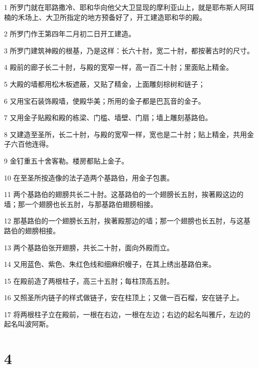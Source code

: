 \par 1 所罗门就在耶路撒冷、耶和华向他父大卫显现的摩利亚山上，就是耶布斯人阿珥楠的禾场上、大卫所指定的地方预备好了，开工建造耶和华的殿。
\par 2 所罗门作王第四年二月初二日开工建造。
\par 3 所罗门建筑神殿的根基，乃是这样：长六十肘，宽二十肘，都按著古时的尺寸。
\par 4 殿前的廊子长二十肘，与殿的宽窄一样，高一百二十肘；里面贴上精金。
\par 5 大殿的墙都用松木板遮蔽，又贴了精金，上面雕刻棕树和链子；
\par 6 又用宝石装饰殿墙，使殿华美；所用的金子都是巴瓦音的金子。
\par 7 又用金子贴殿和殿的栋梁、门槛、墙壁、门扇；墙上雕刻基路伯。
\par 8 又建造至圣所，长二十肘，与殿的宽窄一样，宽也是二十肘；贴上精金，共用金子六百他连得。
\par 9 金钉重五十舍客勒。楼房都贴上金子。
\par 10 在至圣所按造像的法子造两个基路伯，用金子包裹。
\par 11 两个基路伯的翅膀共长二十肘。这基路伯的一个翅膀长五肘，挨著殿这边的墙；那一个翅膀也长五肘，与那基路伯翅膀相接。
\par 12 那基路伯的一个翅膀长五肘，挨著殿那边的墙；那一个翅膀也长五肘，与这基路伯的翅膀相接。
\par 13 两个基路伯张开翅膀，共长二十肘，面向外殿而立。
\par 14 又用蓝色、紫色、朱红色线和细麻织幔子，在其上绣出基路伯来。
\par 15 在殿前造了两根柱子，高三十五肘；每柱顶高五肘。
\par 16 又照圣所内链子的样式做链子，安在柱顶上；又做一百石榴，安在链子上。
\par 17 将两根柱子立在殿前，一根在右边，一根在左边；右边的起名叫雅斤，左边的起名叫波阿斯。

\chapter{4}

